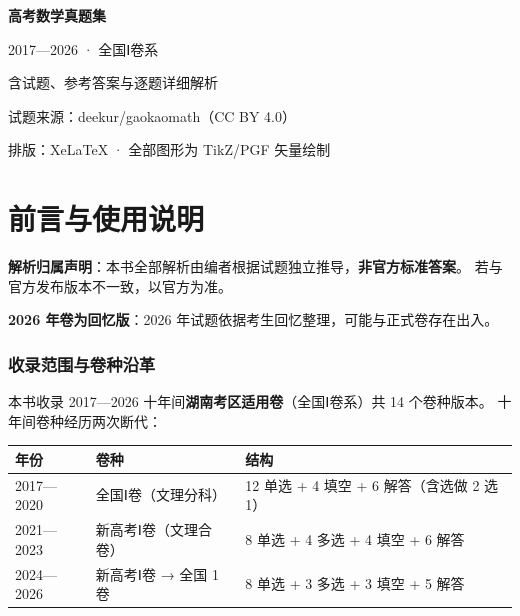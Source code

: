 \documentclass[oneside, openany, zihao=-4, fontset=mac]{ctexbook}
\begin{document}
\frontmatter
\begin{titlepage}
  \centering
  \vspace*{4cm}
  {\bfseries 高考数学真题集\par}
  \vspace{1em}
  { 2017—2026 · 全国Ⅰ卷系\par}
  \vspace{2em}
  { 含试题、参考答案与逐题详细解析\par}
  \vspace{6cm}
  {\small 试题来源：deekur/gaokaomath（CC BY 4.0）\par
   排版：XeLaTeX · 全部图形为 TikZ/PGF 矢量绘制\par}
\end{titlepage}

\chapter{前言与使用说明}

\begin{gknotice}
\textbf{解析归属声明}：本书全部解析由编者根据试题独立推导，\textbf{非官方标准答案}。
若与官方发布版本不一致，以官方为准。
\end{gknotice}

\begin{gknotice}
\textbf{2026 年卷为回忆版}：2026 年试题依据考生回忆整理，可能与正式卷存在出入。
\end{gknotice}

\subsection*{收录范围与卷种沿革}

本书收录 2017—2026 十年间\textbf{湖南考区适用卷}（全国Ⅰ卷系）共 14 个卷种版本。
十年间卷种经历两次断代：

\begin{center}
\begin{tabular}{lll}
\toprule
年份 & 卷种 & 结构 \\
\midrule
2017—2020 & 全国Ⅰ卷（文理分科） & 12 单选 + 4 填空 + 6 解答（含选做 2 选 1） \\
2021—2023 & 新高考Ⅰ卷（文理合卷） & 8 单选 + 4 多选 + 4 填空 + 6 解答 \\
2024—2026 & 新高考Ⅰ卷 → 全国 1 卷 & 8 单选 + 3 多选 + 3 填空 + 5 解答 \\
\bottomrule
\end{tabular}
\end{center}
\end{document}

